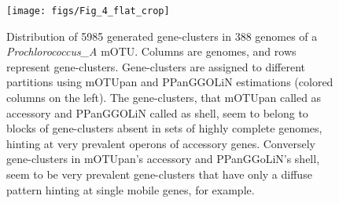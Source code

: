 \documentclass{article}
\begin{document}
\begin{figure}
	\centering
	\texttt{[image: figs/Fig\_4\_flat\_crop]}
	\caption[Prochlorococcus_A heatmap of traits]
	{Distribution of 5985 generated gene-clusters in 388 genomes of a \textit{Prochlorococcus\_A} mOTU. Columns are genomes, and rows represent gene-clusters. Gene-clusters are assigned to different partitions using mOTUpan and PPanGGOLiN estimations (colored columns on the left). The gene-clusters, that mOTUpan called as accessory and PPanGGOLiN called as shell, seem to belong to blocks of gene-clusters absent in sets of highly complete genomes, hinting at very prevalent operons of accessory genes.  Conversely gene-clusters in mOTUpan’s accessory and PPanGGoLiN’s shell, seem to be very prevalent gene-clusters that have only a diffuse pattern hinting at single mobile genes, for example.}
	\label{fig:heatmap}
\end{figure}
\end{document}
